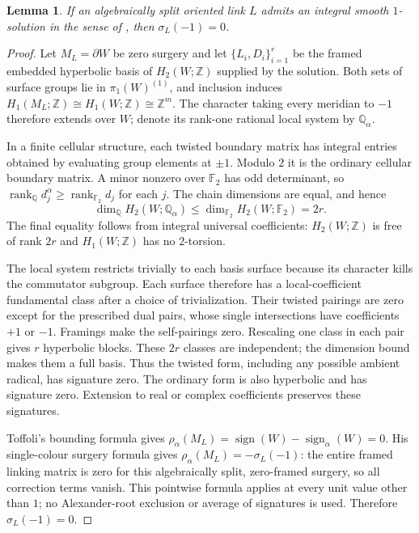 \documentclass[11pt]{article}
\newtheorem{lemma}[theorem]{Lemma}
\newcommand{\Q}{\mathbb Q}
\newcommand{\Z}{\mathbb Z}
\DeclareMathOperator{\sig}{sign}
\begin{document}
\begin{lemma}\label{lem:topology}
If an algebraically split oriented link $L$ admits an integral smooth
$1$-solution in the sense of \cite[Definition 2.3]{Otto}, then
$\sigma_L(-1)=0$.
\end{lemma}
\begin{proof}
Let $M_L=\partial W$ be zero surgery and let
$\{L_i,D_i\}_{i=1}^r$ be the framed embedded hyperbolic basis of
$H_2(W;\Z)$ supplied by the solution. Both sets of surface groups lie
in $\pi_1(W)^{(1)}$, and inclusion induces
$H_1(M_L;\Z)\cong H_1(W;\Z)\cong\Z^m$.
The character taking every meridian to $-1$ therefore extends over $W$;
denote its rank-one rational local system by $\Q_\alpha$.

In a finite cellular structure, each twisted boundary matrix has integral
entries obtained by evaluating group elements at $\pm1$. Modulo $2$ it
is the ordinary cellular boundary matrix. A minor nonzero over
$\mathbb F_2$ has odd determinant, so
$\operatorname{rank}_{\Q}d_j^\alpha\geq
\operatorname{rank}_{\mathbb F_2}d_j$ for each $j$. The chain dimensions
are equal, and hence
\[
 \dim_{\Q}H_2(W;\Q_\alpha)
 \leq\dim_{\mathbb F_2}H_2(W;\mathbb F_2)=2r.
\]
The final equality follows from integral universal coefficients:
$H_2(W;\Z)$ is free of rank $2r$ and $H_1(W;\Z)$ has no $2$-torsion.

The local system restricts trivially to each basis surface because its
character kills the commutator subgroup. Each surface therefore has a
local-coefficient fundamental class after a choice of trivialization.
Their twisted pairings are zero except for the prescribed dual pairs,
whose single intersections have coefficients $+1$ or $-1$.
Framings make the self-pairings zero. Rescaling one class in each pair
gives $r$ hyperbolic blocks. These $2r$ classes are independent; the
dimension bound makes them a full basis. Thus the twisted form, including
any possible ambient radical, has signature zero. The ordinary form is
also hyperbolic and has signature zero. Extension to real or complex
coefficients preserves these signatures.

Toffoli's bounding formula \cite[(1.1)]{Toffoli} gives
$\rho_\alpha(M_L)=\sig(W)-\sig_\alpha(W)=0$.
His single-colour surgery formula \cite[Remark 4.25, (4.21)]{Toffoli}
gives $\rho_\alpha(M_L)=-\sigma_L(-1)$: the entire framed linking
matrix is zero for this algebraically split, zero-framed surgery, so
all correction terms vanish. This pointwise formula applies at every
unit value other than $1$; no Alexander-root exclusion or average of
signatures is used. Therefore $\sigma_L(-1)=0$.
\end{proof}
\end{document}
